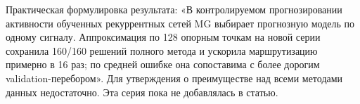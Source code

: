 \documentclass[10pt,a4paper]{article}
\begin{document}
Практическая формулировка результата: «В контролируемом прогнозировании активности обученных рекуррентных сетей MG выбирает прогнозную модель по одному сигналу. Аппроксимация по 128 опорным точкам на новой серии сохранила 160/160 решений полного метода и ускорила маршрутизацию примерно в 16 раз; по средней ошибке она сопоставима с более дорогим validation-перебором». Для утверждения о преимуществе над всеми методами данных недостаточно. Эта серия пока не добавлялась в статью.
\end{document}
